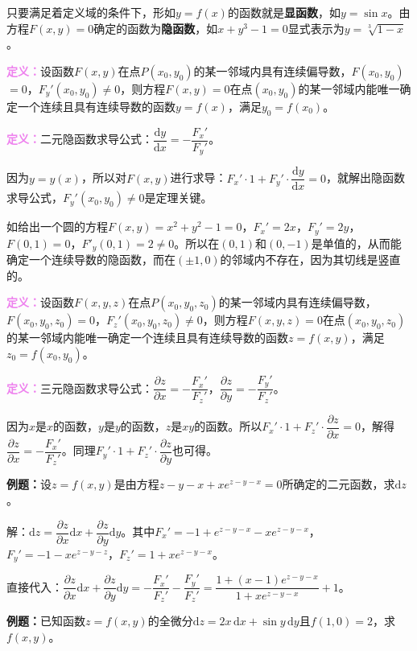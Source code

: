 \documentclass[UTF8, 12pt]{ctexart}
\begin{document}
        只要满足着定义域的条件下，形如$y=f(x)$的函数就是\textbf{显函数}，如$y=\sin x$。由方程$F(x,y)=0$确定的函数为\textbf{隐函数}，如$x+y^3-1=0$显式表示为$y=\sqrt[3]{1-x}$。

        \textcolor{violet}{\textbf{定义：}}设函数$F(x,y)$在点$P(x_0,y_0)$的某一邻域内具有连续偏导数，$F(x_0,y_0)$\\$=0$，$F_y'(x_0,y_0)\neq0$，则方程$F(x,y)=0$在点$(x_0,y_0)$的某一邻域内能唯一确定一个连续且具有连续导数的函数$y=f(x)$，满足$y_0=f(x_0)$。

        \textcolor{violet}{\textbf{定义：}}二元隐函数求导公式：$\dfrac{\textrm{d}y}{\textrm{d}x}=-\dfrac{F_x'}{F_y'}$。

        因为$y=y(x)$，所以对$F(x,y)$进行求导：$F_x'\cdot1+F_y'\cdot\dfrac{\textrm{d}y}{\textrm{d}x}=0$，就解出隐函数求导公式，$F_y'(x_0,y_0)\neq0$是定理关键。

        如给出一个圆的方程$F(x,y)=x^2+y^2-1=0$，$F_x'=2x$，$F_y'=2y$，$F(0,1)=0$，$F'_y(0,1)=2\neq0$。所以在$(0,1)$和$(0,-1)$是单值的，从而能确定一个连续导数的隐函数，而在$(\pm1,0)$的邻域内不存在，因为其切线是竖直的。

        \textcolor{violet}{\textbf{定义：}}设函数$F(x,y,z)$在点$P(x_0,y_0,z_0)$的某一邻域内具有连续偏导数，$F(x_0,y_0,z_0)=0$，$F_z'(x_0,y_0,z_0)\neq0$，则方程$F(x,y,z)=0$在点$(x_0,y_0,z_0)$的某一邻域内能唯一确定一个连续且具有连续导数的函数$z=f(x,y)$，满足$z_0=f(x_0,y_0)$。

        \textcolor{violet}{\textbf{定义：}}三元隐函数求导公式：$\dfrac{\partial z}{\partial x}=-\dfrac{F_x'}{F_z'}$，$\dfrac{\partial z}{\partial y}=-\dfrac{F_y'}{F_z'}$。

        因为$x$是$x$的函数，$y$是$y$的函数，$z$是$xy$的函数。所以$F_x'\cdot1+F_z'\cdot\dfrac{\partial z}{\partial x}=0$，解得$\dfrac{\partial z}{\partial x}=-\dfrac{F_x'}{F_z'}$。同理$F_y'\cdot1+F_z'\cdot\dfrac{\partial z}{\partial y}$也可得。

        \textbf{例题：}设$z=f(x,y)$是由方程$z-y-x+xe^{z-y-x}=0$所确定的二元函数，求$\textrm{d}z$。

        解：$\textrm{d}z=\dfrac{\partial z}{\partial x}\textrm{d}x+\dfrac{\partial z}{\partial y}\textrm{d}y$。其中$F_x'=-1+e^{z-y-x}-xe^{z-y-x}$，$F_y'=-1-xe^{z-y-z}$，$F_z'=1+xe^{z-y-x}$。

        直接代入：$\dfrac{\partial z}{\partial x}\textrm{d}x+\dfrac{\partial z}{\partial y}\textrm{d}y=-\dfrac{F_x'}{F_z'}-\dfrac{F_y'}{F_z'}=\dfrac{1+(x-1)e^{z-y-x}}{1+xe^{z-y-x}}+1$。

        \textbf{例题：}已知函数$z=f(x,y)$的全微分$\textrm{d}z=2x\,\textrm{d}x+\sin y\,\textrm{d}y$且$f(1,0)=2$，求$f(x,y)$。
\end{document}
